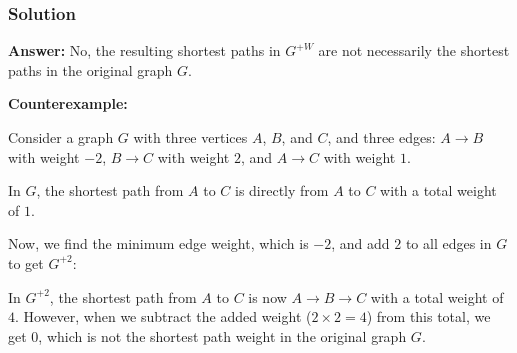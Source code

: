 \documentclass{article}
\begin{document}
\subsubsection{Solution}

\textbf{Answer:} No, the resulting shortest paths in \(G^{+W}\) are not necessarily the shortest paths in the original graph \(G\).

\textbf{Counterexample:}

Consider a graph \(G\) with three vertices \(A\), \(B\), and \(C\), and three edges: \(A \rightarrow B\) with weight \(-2\), \(B \rightarrow C\) with weight \(2\), and \(A \rightarrow C\) with weight \(1\).

\begin{center}
\end{center}

In \(G\), the shortest path from \(A\) to \(C\) is directly from \(A\) to \(C\) with a total weight of \(1\).

Now, we find the minimum edge weight, which is \(-2\), and add \(2\) to all edges in \(G\) to get \(G^{+2}\):

\begin{center}
\end{center}

In \(G^{+2}\), the shortest path from \(A\) to \(C\) is now \(A \rightarrow B \rightarrow C\) with a total weight of \(4\). However, when we subtract the added weight (\(2 \times 2 = 4\)) from this total, we get \(0\), which is not the shortest path weight in the original graph \(G\).
\end{document}
